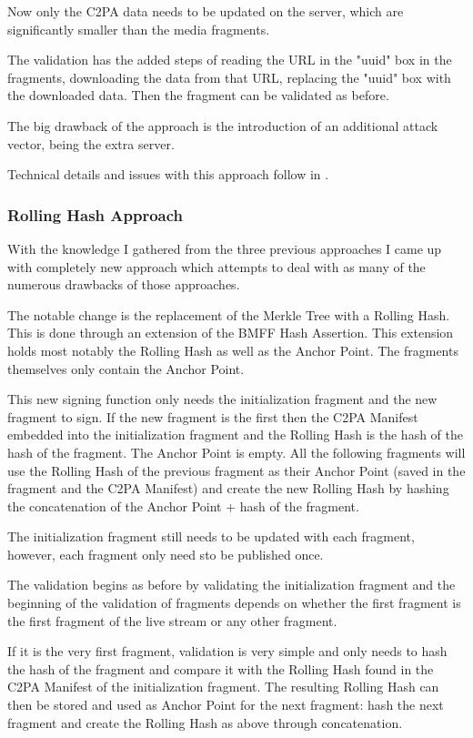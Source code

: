 Now only the C2PA data needs to be updated on the server, which are significantly smaller than the media fragments.

The validation has the added steps of reading the URL in the "uuid" box in the fragments, downloading the data from that URL, replacing the "uuid" box with the downloaded data. Then the fragment can be validated as before.

The big drawback of the approach is the introduction of an additional attack vector, being the extra server.

Technical details and issues with this approach follow in .

\subsubsection{Rolling Hash Approach}

With the knowledge I gathered from the three previous approaches I came up with completely new approach which attempts to deal with as many of the numerous drawbacks of those approaches.

The notable change is the replacement of the Merkle Tree with a Rolling Hash. This is done through an extension of the BMFF Hash Assertion. This extension holds most notably the Rolling Hash as well as the Anchor Point. The fragments themselves only contain the Anchor Point.

This new signing function only needs the initialization fragment and the new fragment to sign. If the new fragment is the first then the C2PA Manifest embedded into the initialization fragment and the Rolling Hash is the hash of the hash of the fragment. The Anchor Point is empty. All the following fragments will use the Rolling Hash of the previous fragment as their Anchor Point (saved in the fragment and the C2PA Manifest) and create the new Rolling Hash by hashing the concatenation of the Anchor Point + hash of the fragment.

The initialization fragment still needs to be updated with each fragment, however, each fragment only need sto be published once.

The validation begins as before by validating the initialization fragment and the beginning of the validation of fragments depends on whether the first fragment is the first fragment of the live stream or any other fragment. 

If it is the very first fragment, validation is very simple and only needs to hash the hash of the fragment and compare it with the Rolling Hash found in the C2PA Manifest of the initialization fragment. The resulting Rolling Hash can then be stored and used as Anchor Point for the next fragment: hash the next fragment and create the Rolling Hash as above through concatenation.

